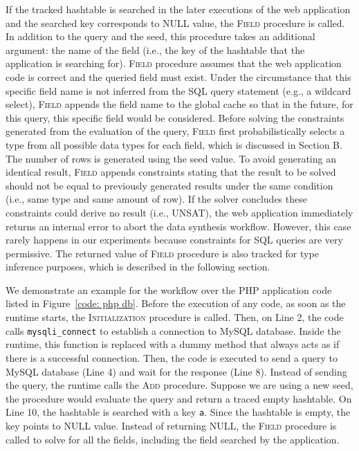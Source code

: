 \documentclass[10pt,conference]{IEEEtran}
\begin{document}
If the tracked hashtable is searched in the later executions of the web application and the searched key corresponds to NULL value, the \textsc{Field} procedure is called. In addition to the query and the seed, this procedure takes an additional argument: the name of the field (i.e., the key of the hashtable that the application is searching for). \textsc{Field} procedure assumes that the web application code is correct and the queried field must exist. Under the circumstance that this specific field name is not inferred from the SQL query statement (e.g., a wildcard select), \textsc{Field} appends the field name to the global cache so that in the future, for this query, this specific field would be considered. Before solving the constraints generated from the evaluation of the query, \textsc{Field} first probabilistically selects a type from all possible data types for each field, which is discussed in Section B. The number of rows is generated using the seed value. To avoid generating an identical result, \textsc{Field} appends constraints stating that the result to be solved should not be equal to previously generated results under the same condition (i.e., same type and same amount of row). If the solver concludes these constraints could derive no result (i.e., UNSAT), the web application immediately returns an internal error to abort the data synthesis workflow. However, this case rarely happens in our experiments because constraints for SQL queries are very permissive. The returned value of \textsc{Field} procedure is also tracked for type inference purposes, which is described in the following section. %

We demonstrate an example for the workflow over the PHP application code listed in Figure~\ref{code: php db}. Before the execution of any code, as soon as the runtime starts, the \textsc{Initialization} procedure is called. Then, on Line 2, the code calls \verb|mysqli_connect| to establish a connection to MySQL database. Inside the runtime, this function is replaced with a dummy method that always acts as if there is a successful connection. Then, the code is executed to send a query to MySQL database (Line 4) and wait for the response (Line 8). Instead of sending the query, the runtime calls the \textsc{Add} procedure. Suppose we are using a new seed, the procedure would evaluate the query and return a traced empty hashtable. On Line 10, the hashtable is searched with a key \verb|a|. Since the hashtable is empty, the key points to NULL value. Instead of returning NULL, the \textsc{Field} procedure is called to solve for all the fields, including the field searched by the application. 
\end{document}
